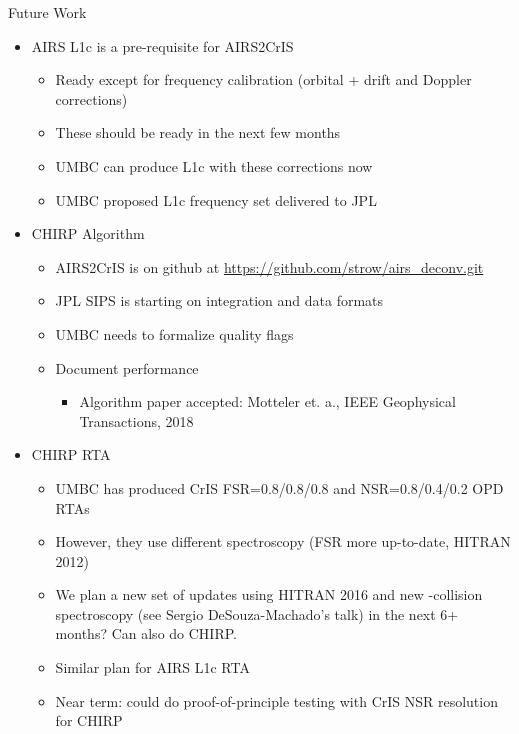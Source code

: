 \documentclass[10pt,t]{beamer}
\begin{document}
\begin{frame}[shrink=20,label={sec:org31cb072}]{Future Work}
\begin{itemize}
\item AIRS L1c is a pre-requisite for AIRS2CrIS
\begin{itemize}
\item Ready except for frequency calibration (orbital + drift and Doppler corrections)
\item These should be ready in the next few months
\item UMBC can produce L1c with these corrections now
\item UMBC proposed L1c frequency set delivered to JPL
\end{itemize}
\item CHIRP Algorithm
\begin{itemize}
\item AIRS2CrIS is on github at \url{https://github.com/strow/airs\_deconv.git}
\item JPL SIPS is starting on integration and data formats
\item UMBC needs to formalize quality flags
\item Document performance 
\begin{itemize}
\item Algorithm paper accepted: Motteler et. a., IEEE Geophysical Transactions, 2018
\end{itemize}
\end{itemize}
\item CHIRP RTA
\begin{itemize}
\item UMBC has produced CrIS FSR=0.8/0.8/0.8 and NSR=0.8/0.4/0.2 OPD RTAs
\item However, they use different spectroscopy (FSR more up-to-date, HITRAN 2012)
\item We plan a new set of updates using HITRAN 2016 and new \cd-\water collision spectroscopy (see Sergio DeSouza-Machado's talk) in the next 6+ months?  Can also do CHIRP.
\item Similar plan for AIRS L1c RTA
\item Near term: could do proof-of-principle testing with CrIS NSR resolution for CHIRP
\end{itemize}
\end{itemize}
\end{frame}
\end{document}

